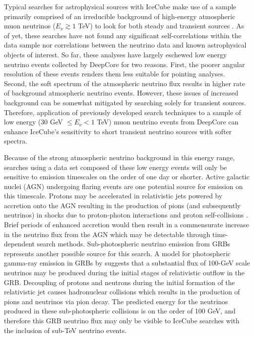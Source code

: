 \documentclass[manuscript]{aastex}
\begin{document}
Typical searches for astrophysical sources with IceCube make use of a sample primarily comprised of an irreducible background of high-energy atmospheric muon neutrinos ($E_{\nu} \gtrsim 1$ TeV) to look for both steady \citep{2014ApJ...796..109A} and transient sources \citep{2015arXiv150300598A}. As of yet, these searches have not found any significant self-correlations within the data sample nor correlations between the neutrino data and known astrophysical objects of interest. So far, these analyses have largely eschewed low energy neutrino events collected by DeepCore for two reasons. First, the poorer angular resolution of these events renders them less suitable for pointing analyses. Second, the soft spectrum of the atmospheric neutrino flux results in higher rate of background atmospheric neutrino events. However, these issues of increased background can be somewhat mitigated by searching solely for transient sources. Therefore, application of previously developed search techniques to a sample of low energy (30 GeV $\leq E_{\nu} < 1$ TeV) muon neutrino events from DeepCore can enhance IceCube's sensitivity to short transient neutrino sources with softer spectra.

Because of the strong atmospheric neutrino background in this energy range, searches using a data set composed of these low energy events will only be sensitive to emission timescales on the order of one day or shorter. Active galactic nuclei (AGN) undergoing flaring events are one potential source for emission on this timescale. Protons may be accelerated in relativistic jets powered by accretion onto the AGN resulting in the production of pions (and subsequently neutrinos) in shocks due to proton-photon interactions and proton self-collisions \citep{2009APh....31..138B}. Brief periods of enhanced accretion would then result in a commensurate increase in the neutrino flux from the AGN which may be detectable through time-dependent search methods. Sub-photospheric neutrino emission from GRBs represents another possible source for this search. A model for photospheric gamma-ray emission in GRBs by \cite{2013PhRvL.111m1102M} suggests that a substantial flux of 100-GeV scale neutrinos may be produced during the initial stages of relativistic outflow in the GRB. Decoupling of protons and neutrons during the initial formation of the relativistic jet causes hadronuclear collisions which results in the production of pions and neutrinos via pion decay. The predicted energy for the neutrinos produced in these sub-photospheric collisions is on the order of 100 GeV, and therefore this GRB neutrino flux may only be visible to IceCube searches with the inclusion of sub-TeV neutrino events. 
\end{document}
